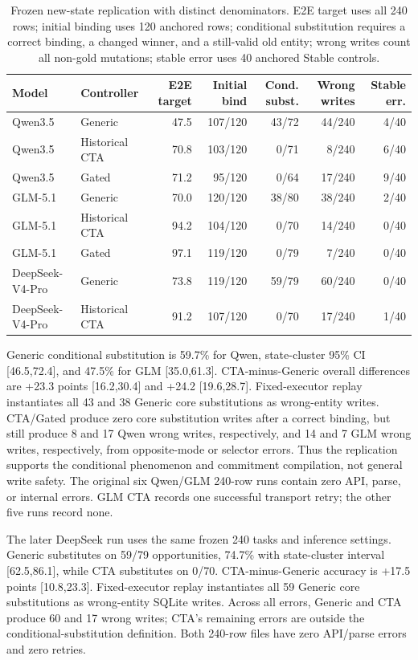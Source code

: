 \documentclass[10pt]{article}
\begin{document}
\begin{table}[h]
\centering
\small
\begin{tabular}{llrrrrr}
\toprule
Model & Controller & E2E target & Initial bind & Cond. subst. & Wrong writes & Stable err. \\
\midrule
Qwen3.5 & Generic & 47.5 & 107/120 & 43/72 & 44/240 & 4/40 \\
Qwen3.5 & Historical CTA & 70.8 & 103/120 & 0/71 & 8/240 & 6/40 \\
Qwen3.5 & Gated & 71.2 & 95/120 & 0/64 & 17/240 & 9/40 \\
GLM-5.1 & Generic & 70.0 & 120/120 & 38/80 & 38/240 & 2/40 \\
GLM-5.1 & Historical CTA & 94.2 & 104/120 & 0/70 & 14/240 & 0/40 \\
GLM-5.1 & Gated & 97.1 & 119/120 & 0/79 & 7/240 & 0/40 \\
DeepSeek-V4-Pro & Generic & 73.8 & 119/120 & 59/79 & 60/240 & 0/40 \\
DeepSeek-V4-Pro & Historical CTA & 91.2 & 107/120 & 0/70 & 17/240 & 1/40 \\
\bottomrule
\end{tabular}
\caption{Frozen new-state replication with distinct denominators. E2E target uses all 240 rows;
initial binding uses 120 anchored rows; conditional substitution requires a correct binding, a changed
winner, and a still-valid old entity; wrong writes count all non-gold mutations; stable error uses
40 anchored Stable controls.}
\end{table}

Generic conditional substitution is 59.7\% for Qwen, state-cluster 95\% CI [46.5,72.4], and
47.5\% for GLM [35.0,61.3]. CTA-minus-Generic overall differences are +23.3 points
[16.2,30.4] and +24.2 [19.6,28.7]. Fixed-executor replay instantiates all 43 and 38 Generic core
substitutions as wrong-entity writes. CTA/Gated produce zero core substitution writes after a correct binding, but
still produce 8 and 17 Qwen wrong writes, respectively, and 14 and 7 GLM wrong writes,
respectively, from opposite-mode or selector errors. Thus
the replication supports the conditional phenomenon and commitment compilation, not general
write safety. The original six Qwen/GLM 240-row runs contain zero API, parse, or internal errors.
GLM CTA records one successful transport retry; the other five runs record none.

The later DeepSeek run uses the same frozen 240 tasks and inference settings. Generic substitutes
on 59/79 opportunities, 74.7\% with state-cluster interval [62.5,86.1], while CTA substitutes on 0/70.
CTA-minus-Generic accuracy is +17.5 points [10.8,23.3]. Fixed-executor replay instantiates all 59
Generic core substitutions as wrong-entity SQLite writes. Across all errors, Generic and CTA produce 60 and 17 wrong writes;
CTA's remaining errors are outside the conditional-substitution definition. Both 240-row files have zero
API/parse errors and zero retries.
\end{document}
